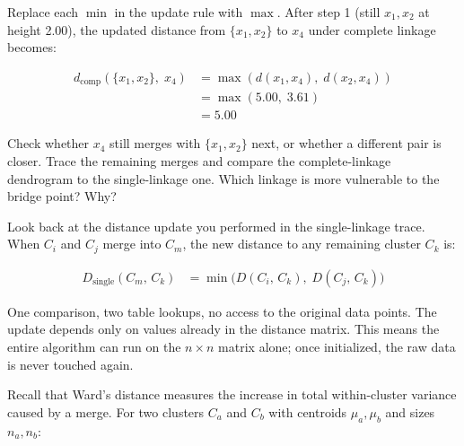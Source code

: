 Replace each $\min$ in the update rule with $\max$.
After step 1 (still $x_1, x_2$ at height 2.00), the updated distance from $\{x_1,x_2\}$ to $x_4$ under complete linkage becomes:

\begin{align*}
    d_{\mathrm{comp}}\!\left(\{x_1,x_2\},\; x_4\right) &= \max\!\left(d(x_1,x_4),\; d(x_2,x_4)\right) \\
                                                          &= \max(5.00,\; 3.61) \\
                                                          &= 5.00
\end{align*}

Check whether $x_4$ still merges with $\{x_1,x_2\}$ next, or whether a different pair is closer.
Trace the remaining merges and compare the complete-linkage dendrogram to the single-linkage one.
Which linkage is more vulnerable to the bridge point? Why?




Look back at the distance update you performed in the single-linkage trace.
When $C_i$ and $C_j$ merge into $C_m$, the new distance to any remaining cluster $C_k$ is:

\begin{align*}
    D_{\mathrm{single}}(C_m,\, C_k) &= \min\!\bigl(D(C_i,\, C_k),\; D(C_j,\, C_k)\bigr)
\end{align*}

One comparison, two table lookups, no access to the original data points.
The update depends only on values already in the distance matrix.
This means the entire algorithm can run on the $n \times n$ matrix alone; once initialized, the raw data is never touched again.


Recall that Ward's distance measures the increase in total within-cluster variance caused by a merge.
For two clusters $C_a$ and $C_b$ with centroids $\mu_a, \mu_b$ and sizes $n_a, n_b$:

